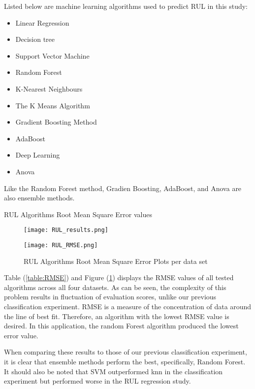 \enlargethispage{-1\baselineskip}
Listed below are machine learning algorithms used to predict RUL in this study:
\begin{itemize}
    \item Linear Regression
    \item Decision tree
    \item Support Vector Machine
    \item Random Forest
    \item K-Nearest Neighbours
    \item The K Means Algorithm
    \item Gradient Boosting Method
    \item AdaBoost
    \item Deep Learning
    \item Anova 
\end{itemize}
\bigskip

Like the Random Forest method, Gradien Boosting, AdaBoost, and Anova are also ensemble methods.


\begin{table}[h]
    \bigskip
    \caption{RUL Algorithms Root Mean Square Error values\cite{RUL}}
    \begin{figure}[H]
        \texttt{[image: RUL\_results.png]}
        \centering
    \end{figure}
    \label{table:RMSE}
\end{table}

\begin{figure}[H]
    \caption{RUL Algorithms Root Mean Square Error Plots per data set\cite{RUL}}
    \texttt{[image: RUL\_RMSE.png]}
    \label{fig:RMSE Plots}
\end{figure}

Table (\ref{table:RMSE}) and Figure (\ref{fig:RMSE Plots}) displays the RMSE values of all tested algorithms across all four datasets.
As can be seen, the complexity of this problem results in fluctuation of evaluation scores, unlike our previous classification experiment.
RMSE is a measure of the concentration of data around the line of best fit. Therefore, an algorithm with the lowest RMSE value is desired.
In this application, the random Forest algorithm produced the lowest error value.

When comparing these results to those of our previous classification experiment, it is clear that ensemble methods perform the best, specifically, Random Forest. 
It should also be noted that SVM outperformed knn in the classification experiment but performed worse in the RUL regression study.

